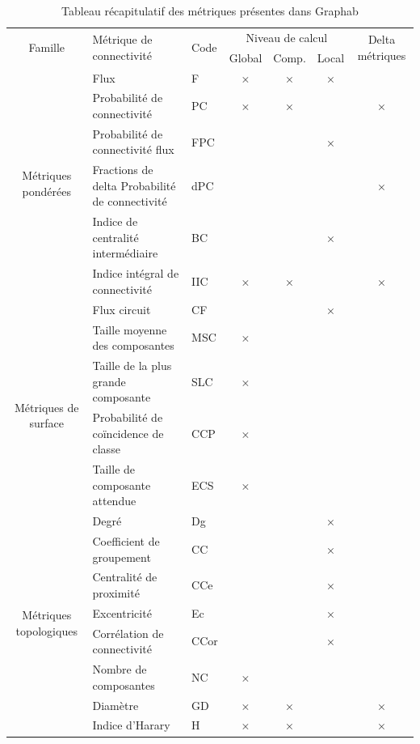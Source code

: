 \documentclass{article}
\begin{document}
\begin{table}[H]
	\begin{tabular}{|c|p{7cm}|l|c|c|c|c|}
		\hline
		\multirow{2}{*}{Famille} & \multirow{2}{*}{Métrique de connectivité} & \multirow{2}{*}{Code} & \multicolumn{3}{m{3cm}|}{\centering Niveau de calcul} & \multirow{2}{1.5cm}{Delta métriques}\\
		\hhline{~~~---~}
		&  &  & Global & Comp. & Local & \\
		\hline
		\multirow{6}{2cm}{Métriques pondérées}
		& Flux & F & × & × & × & \\
		& Probabilité de connectivité & PC & × & × &  & ×\\
		& Probabilité de connectivité flux & FPC &  &  & × & \\
		& Fractions de delta Probabilité de connectivité & dPC &  &  &  & ×\\
		& Indice de centralité intermédiaire & BC &  &  & × & \\
		& Indice intégral de connectivité & IIC & × & × &  & ×\\
		& Flux circuit & CF &  &  & × & \\
		\hline
		\multirow{4}{2cm}{Métriques de surface}
		& Taille moyenne des composantes & MSC & × &  &  & \\
		& Taille de la plus grande composante & SLC & × &  &  & \\
		& Probabilité de coïncidence de classe & CCP & × &  &  & \\
		& Taille de composante attendue & ECS & × &  &  & \\
		\hline
		\multirow{9}{2cm}{Métriques topologiques}
		& Degré & Dg &  &  & × & \\
		& Coefficient de groupement & CC &  &  & × & \\
		& Centralité de proximité & CCe &  &  & × & \\
		& Excentricité & Ec &  &  & × & \\
		& Corrélation de connectivité & CCor &  &  & × & \\
		& Nombre de composantes & NC & × &  &  & \\
		& Diamètre & GD & × & × &  & ×\\
		& Indice d’Harary & H & × & × &  & ×\\
		\hline
	\end{tabular}
	\caption{Tableau récapitulatif des métriques présentes dans Graphab}
\end{table}
\end{document}
